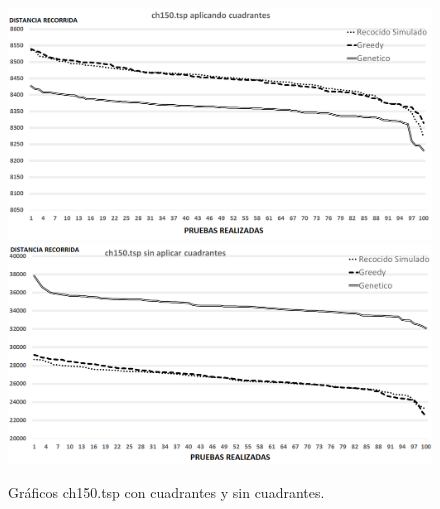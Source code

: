  \begin{figure}[hbtp]
    \centering
        \includegraphics[width=1\textwidth]{PruebasResultados/Experimentos_Graficos_Con/ch150.png}
        \includegraphics[width=1\textwidth]{PruebasResultados/Experimentos_Graficos_Sin/ch150.png}
        \caption{Gráficos ch150.tsp con cuadrantes y sin cuadrantes.}
        \label{fig:ch150_grafica.png}
\end{figure}
\newpage

